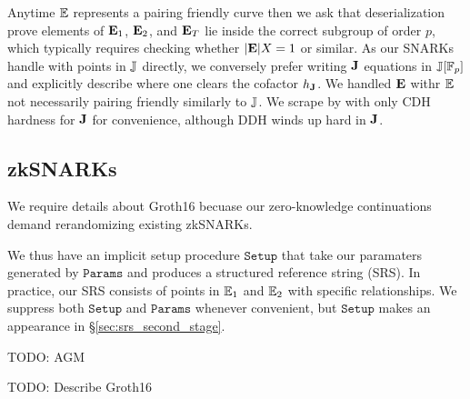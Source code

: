 Anytime ${\mathbb{E}}$ represents a pairing friendly curve then we ask that
deserialization prove elements of ${\mathbf{E}}_1$, ${\mathbf{E}}_2$, and ${\mathbf{E}}_T$
lie inside the correct subgroup of order $p$,
 which typically requires checking whether $|{\mathbf{E}}| X = 1$ or similar.
As our SNARKs handle with points in ${\mathbb{J}}$ directly, we conversely
prefer writing ${\mathbf{J}}$ equations in ${\mathbb{J}}[\mathbb{F}_p]$ and explicitly describe
where one clears the cofactor $h_{{\mathbf{J}}}$.  We handled ${\mathbf{E}}$ withr
${\mathbb{E}}$ not necessarily pairing friendly similarly to ${\mathbb{J}}$.
We scrape by with only CDH hardness for ${\mathbf{J}}$ for convenience,
although DDH winds up hard in ${\mathbf{J}}$.



\subsection{zkSNARKs}

We require details about Groth16 \cite{Groth16} becuase our zero-knowledge continuations demand rerandomizing existing zkSNARKs. %

We thus have an implicit setup procedure $\mathtt{Setup}$ that take our paramaters generated by $\mathtt{Params}$ and produces a structured reference string (SRS).  In practice, our SRS consists of points in ${\mathbb{E}}_1$ and ${\mathbb{E}}_2$ with specific relationships.  We suppress both $\mathtt{Setup}$ and $\mathtt{Params}$ whenever convenient, but $\mathtt{Setup}$ makes an appearance in \S\ref{sec:srs_second_stage}.

TODO: AGM

TODO: Describe Groth16 \cite{Groth16} 

































\endinput



BROKEN BOLOW THIS




We fix $J \in \ecJ$ as a generator for public keys.  Any $\KeyGen$ algorithm randomly samples a secret keys $\sk \in \F_q$ and then computes its associate public keys $\pk = \sk J$.  We shall not discuss infrastructure that authorizes public keys.  Yet although our results do not require proof-of-knowledge on $\pk$ per se, we still strongly recommend that back certifications accompany any certificates that authorize $\pk$.

\smallskip




